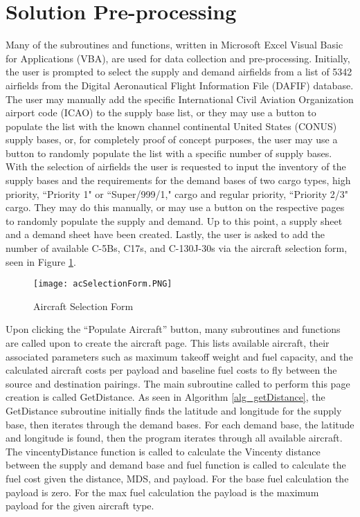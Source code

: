 \section{Solution Pre-processing} \label{sec_solutionPreProcessing}
Many of the subroutines and functions, written in Microsoft Excel Visual Basic for Applications (VBA), are used for data collection and pre-processing. Initially, the user is prompted to select the supply and demand airfields from a list of 5342 airfields from the Digital Aeronautical Flight Information File (DAFIF) database. The user may manually add the specific International Civil Aviation Organization airport code (ICAO) to the supply base list, or they may use a button to populate the list with the known channel continental United States (CONUS) supply bases, or, for completely proof of concept purposes, the user may use a button to randomly populate the list with a specific number of supply bases. With the selection of airfields the user is requested to input the inventory of the supply bases and the requirements for the demand bases of two cargo types, high priority, ``Priority 1" or ``Super/999/1," cargo and regular priority, ``Priority 2/3" cargo. They may do this manually, or may use a button on the respective pages to randomly populate the supply and demand. Up to this point, a supply sheet and a demand sheet have been created. Lastly, the user is asked to add the number of available C-5Bs, C17s, and C-130J-30s via the aircraft selection form, seen in Figure \ref{fig_acSelectionForm}. \par
\begin{figure}[H]
\centering
\texttt{[image: acSelectionForm.PNG]}
\caption{Aircraft Selection Form}
\label{fig_acSelectionForm}
\end{figure}
Upon clicking the ``Populate Aircraft'' button, many subroutines and functions are called upon to create the aircraft page. This lists available aircraft, their associated parameters such as maximum takeoff weight and fuel capacity, and the calculated aircraft costs per payload and baseline fuel costs to fly between the source and destination pairings. The main subroutine called to perform this page creation is called GetDistance. As seen in Algorithm \ref{alg_getDistance}, the GetDistance subroutine initially finds the latitude and longitude for the supply base, then iterates through the demand bases. For each demand base, the latitude and longitude is found, then the program iterates through all available aircraft. The vincentyDistance function is called to calculate the Vincenty distance between the supply and demand base and fuel function is called to calculate the fuel cost given the distance, MDS, and payload.  For the base fuel calculation the payload is zero. For the max fuel calculation the payload is the maximum payload for the given aircraft type.\par
